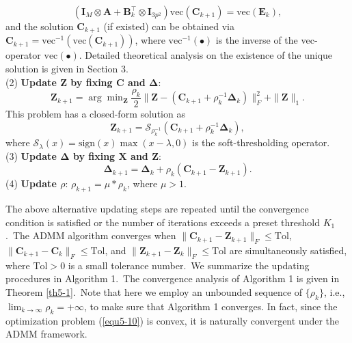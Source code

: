 \begin{equation}
\label{equ5-14}
(\bm{I}_{M}\otimes\bm{A}
+
\bm{B}_{k}^{\top}\otimes\bm{I}_{3p^2})\text{vec}(\bm{C}_{k+1})
=
\text{vec}(\bm{E}_{k}),
\end{equation}
and the solution $\bm{C}_{k+1}$ (if existed) can be obtained via $\bm{C}_{k+1}=\text{vec}^{-1}(\text{vec}(\bm{C}_{k+1}))$, where $\text{vec}^{-1}(\bullet)$ is the inverse of the vec-operator $\text{vec}(\bullet)$.
Detailed theoretical analysis on the existence of the unique solution is given in Section 3.
\\
(2) \textbf{Update $\bm{Z}$ by fixing $\bm{C}$ and $\bm{\Delta}$}:
\begin{equation}
\label{equ5-15}
\bm{Z}_{k+1}
=
\arg\min\nolimits_{\bm{Z}}\frac{\rho_{k}}{2}
\|\bm{Z} - (\bm{C}_{k+1}+\rho_{k}^{-1}\bm{\Delta}_{k})\|_{F}^{2}
+
\|\bm{Z}\|_{1}.
\end{equation}
This problem has a closed-form solution as 
\begin{equation}
\label{equ5-16}
\bm{Z}_{k+1}
=
\mathcal{S}_{\rho_{k}^{-1}}(\bm{C}_{k+1}+\rho_{k}^{-1}\bm{\Delta}_{k}),
\end{equation}
where $\mathcal{S}_{\lambda}(x) = \text{sign}(x)\max(x-\lambda, 0)$ is the soft-thresholding operator.
\\
(3) \textbf{Update $\bm{\Delta}$ by fixing $\bm{X}$ and $\bm{Z}$}:
\begin{equation}
\label{equ5-17}
\bm{\Delta}_{k+1}
=
\bm{\Delta}_{k} + \rho_{k}(\bm{C}_{k+1}-\bm{Z}_{k+1}).
\end{equation}
(4) \textbf{Update $\rho$}: $\rho_{k+1}= \mu*\rho_{k}$, where $\mu>1$.

The above alternative updating steps are repeated until the convergence condition is satisfied or the number of iterations exceeds a preset threshold $K_{1}$.\ The ADMM algorithm converges when $\|\bm{C}_{k+1}-\bm{Z}_{k+1}\|_{F}\le \text{Tol}$, $\|\bm{C}_{k+1}-\bm{C}_{k}\|_{F}\le \text{Tol}$, and $\|\bm{Z}_{k+1}-\bm{Z}_{k}\|_{F}\le \text{Tol}$ are simultaneously satisfied, where $\text{Tol}>0$ is a small tolerance number.\ We summarize the updating procedures in Algorithm 1.\ The convergence analysis of Algorithm 1 is given in Theorem \ref{th5-1}.\ Note that here we employ an unbounded sequence of $\{\rho_{k}\}$, i.e., $\lim_{k \to \infty} \rho_{k}=+\infty$, to make sure that Algorithm 1 converges. In fact, since the optimization problem (\ref{equ5-10}) is convex, it is naturally convergent under the ADMM \cite{admm} framework.


